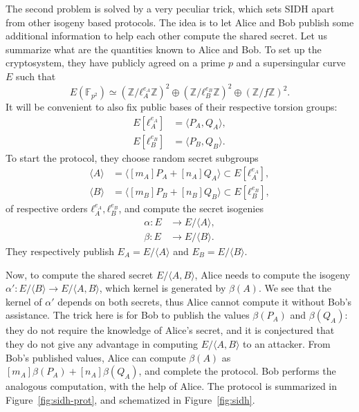 \documentclass[10pt]{article}
\theoremstyle{plain}
\theoremstyle{definition}
\def\F{\ensuremath{\mathbb{F}}}
\begin{document}
The second problem is solved by a very peculiar trick, which sets SIDH
apart from other isogeny based protocols. %
The idea is to let Alice and Bob publish some additional information
to help each other compute the shared secret. %
Let us summarize what are the quantities known to Alice and Bob. %
To set up the cryptosystem, they have publicly agreed on a prime $p$
and a supersingular curve $E$ such that
\[E(\F_{p^2}) ≃ (ℤ/ℓ_A^{e_A}ℤ)^2⊕(ℤ/ℓ_B^{e_B}ℤ)^2⊕(ℤ/fℤ)^2.\] %
It will be convenient to also fix public bases of their respective
torsion groups:
\begin{align*}
  E[ℓ_A^{e_A}] &= 〈P_A,Q_A〉,\\
  E[ℓ_B^{e_B}] &= 〈P_B,Q_B〉.
\end{align*}
To start the protocol, they choose random secret subgroups
\begin{align*}
  〈A〉 &= 〈[m_A]P_A+[n_A]Q_A〉 ⊂ E[ℓ_A^{e_A}],\\  
  〈B〉 &= 〈[m_B]P_B+[n_B]Q_B〉 ⊂ E[ℓ_B^{e_B}],
\end{align*}
of respective orders $ℓ_A^{e_A},ℓ_B^{e_B}$, and compute the secret
isogenies
\begin{align*}
  α : E &\to E/〈Α〉,\\
  β : E &\to E/〈B〉.
\end{align*}
They respectively publish $E_A=E/〈Α〉$ and $E_B=E/〈B〉$. %

Now, to compute the shared secret $E/〈A,B〉$, Alice needs to compute
the isogeny $α':E/〈B〉\to E/〈A,B〉$, which kernel is generated by
$β(A)$. %
We see that the kernel of $α'$ depends on both secrets, thus Alice
cannot compute it without Bob's assistance. %
The trick here is for Bob to publish the values $β(P_A)$ and $β(Q_A)$:
they do not require the knowledge of Alice's secret, and it is
conjectured that they do not give any advantage in computing
$E/〈A,B〉$ to an attacker. %
From Bob's published values, Alice can compute $β(A)$ as
$[m_A]β(P_A) + [n_A]β(Q_A)$, and complete the protocol. %
Bob performs the analogous computation, with the help of Alice. %
The protocol is summarized in Figure~\ref{fig:sidh-prot}, and
schematized in Figure~\ref{fig:sidh}.
\end{document}
